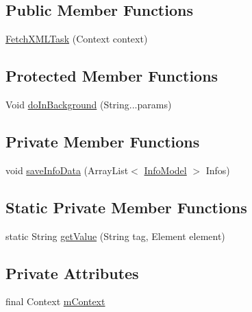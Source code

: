 \subsection*{Public Member Functions}
\begin{DoxyCompactItemize}
\item 
\hyperlink{classorg_1_1buildmlearn_1_1infotemplate_1_1data_1_1FetchXMLTask_a016d44d6328245155a33ddc123e456ae}{Fetch\+X\+M\+L\+Task} (Context context)
\end{DoxyCompactItemize}
\subsection*{Protected Member Functions}
\begin{DoxyCompactItemize}
\item 
Void \hyperlink{classorg_1_1buildmlearn_1_1infotemplate_1_1data_1_1FetchXMLTask_ae597dd994a1571bce188081961eea08b}{do\+In\+Background} (String...\+params)
\end{DoxyCompactItemize}
\subsection*{Private Member Functions}
\begin{DoxyCompactItemize}
\item 
void \hyperlink{classorg_1_1buildmlearn_1_1infotemplate_1_1data_1_1FetchXMLTask_a4dd28fce3ccc052907a212f1cbc23901}{save\+Info\+Data} (Array\+List$<$ \hyperlink{classorg_1_1buildmlearn_1_1infotemplate_1_1data_1_1InfoModel}{Info\+Model} $>$ Infos)
\end{DoxyCompactItemize}
\subsection*{Static Private Member Functions}
\begin{DoxyCompactItemize}
\item 
static String \hyperlink{classorg_1_1buildmlearn_1_1infotemplate_1_1data_1_1FetchXMLTask_ad7d03a73b0c850add6f34687c921e5e8}{get\+Value} (String tag, Element element)
\end{DoxyCompactItemize}
\subsection*{Private Attributes}
\begin{DoxyCompactItemize}
\item 
final Context \hyperlink{classorg_1_1buildmlearn_1_1infotemplate_1_1data_1_1FetchXMLTask_a6659908bc54d942caa6c25fb58f0c409}{m\+Context}
\end{DoxyCompactItemize}


